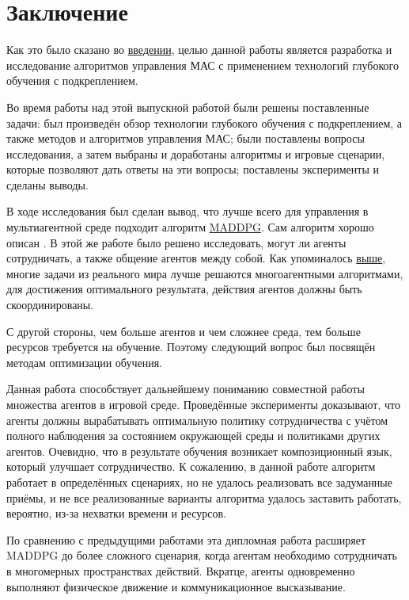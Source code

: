 \chapter*{Заключение} \label{ch-conclusion}

Как это было сказано во \hyperref[intro]{введении}, целью данной работы является разработка и исследование алгоритмов управления МАС с применением технологий глубокого обучения с подкреплением. 

Во время работы над этой выпускной работой были решены поставленные задачи: был произведён обзор технологии глубокого обучения с подкреплением, а также методов и алгоритмов управления МАС; были поставлены вопросы исследования, а затем выбраны и доработаны алгоритмы и игровые сценарии, которые позволяют дать ответы на эти вопросы; поставлены эксперименты и сделаны выводы.

В ходе исследования был сделан вывод, что лучше всего для управления в мультиагентной среде подходит алгоритм \hyperref[acr:maddpg]{MADDPG}. Сам алгоритм хорошо описан \cite{lowe2017multiagent}. В этой же работе было решено исследовать, могут ли агенты сотрудничать, а также общение агентов между собой. Как упоминалось \hyperref[ch2:ma-algs]{выше}, многие задачи из реального мира лучше решаются многоагентными алгоритмами, для достижения оптимального результата, действия агентов должны быть скоординированы.

С другой стороны, чем больше агентов и чем сложнее среда, тем больше ресурсов требуется на обучение. Поэтому следующий вопрос был посвящён методам оптимизации обучения.

Данная работа способствует дальнейшему пониманию совместной работы множества агентов в игровой среде. Проведённые эксперименты доказывают, что агенты должны вырабатывать оптимальную политику сотрудничества с учётом полного наблюдения за состоянием окружающей среды и политиками других агентов. Очевидно, что в результате обучения возникает композиционный язык, который улучшает сотрудничество. К сожалению, в данной работе алгоритм работает в определённых сценариях, но не удалось реализовать все задуманные приёмы, и не все реализованные варианты алгоритма удалось заставить работать, вероятно, из-за нехватки времени и ресурсов.

По сравнению с предыдущими работами эта дипломная работа расширяет MADDPG до более сложного сценария, когда агентам необходимо сотрудничать в многомерных пространствах действий. Вкратце, агенты одновременно выполняют физическое движение и коммуникационное высказывание.

